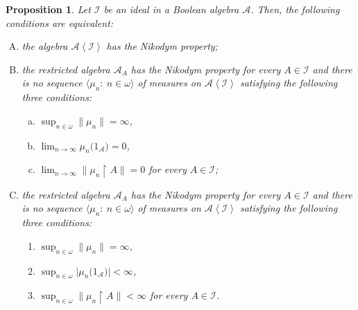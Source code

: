 \documentclass[a4paper,11pt,fleqn]{amsart}
\newtheorem{proposition}[theorem]{Proposition}
\theoremstyle{definition}
\theoremstyle{remark}
\numberwithin{equation}{section}
\newcommand{\N}{\mathbb{N}}
\newcommand{\aA}{\mathcal{A}}
\newcommand{\iI}{\mathcal{I}}
\newcommand{\rstr}{\restriction}
\newcommand{\seqn}[1]{\big\langle#1\colon\ n\io\big\rangle}
\newcommand{\gen}[1]{\mathopen{}\left\langle#1\mathclose{}\right\rangle}
\newcommand{\io}{\in\omega}%
\begin{document}
\begin{proposition}\label{prop:ai_nikodym_char}
Let $\iI$ be an ideal in a Boolean algebra $\aA$. Then, the following conditions are equivalent:
\begin{enumerate}[(A),itemsep=1mm]
    \item the algebra $\aA\gen{\iI}$ has the Nikodym property;
    \item the restricted algebra $\aA_A$ has the Nikodym property for every $A\in\iI$ and there is no sequence $\seqn{\mu_n}$ of measures on $\aA\gen{\iI}$ satisfying the following three conditions:
    \begin{enumerate}[(a)]
	   \item $\sup_{n\in\omega}\big\|\mu_n\big\|=\infty$,
	   \item $\lim_{n\to\infty} \mu_n\big(1_\aA\big)=0$,
	   \item $\lim_{n\to\infty}\big\|\mu_n\rstr A\big\|=0$ for every $A\in\iI$;
    \end{enumerate}
    \item the restricted algebra $\aA_A$ has the Nikodym property for every $A\in\iI$ and there is no sequence $\seqn{\mu_n}$ of measures on $\aA\gen{\iI}$ satisfying the following three conditions:
    \begin{enumerate}[(a')]
	   \item $\sup_{n\in\omega}\big\|\mu_n\big\|=\infty$,
	   \item $\sup_{n\in\omega}\big|\mu_n\big(1_\aA\big)\big|<\infty$,
	   \item $\sup_{n\in\omega}\big\|\mu_n\rstr A\big\|<\infty$ for every $A\in\iI$.
    \end{enumerate}
\end{enumerate}

\end{proposition}
\end{document}
